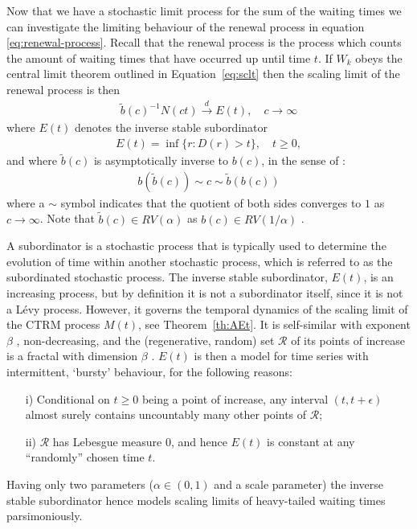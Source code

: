\documentclass[honours,12pt]{unswthesis}
\newcommand{\1}{\mathbf 1}
\newcommand{\cd}{\overset{d}{\longrightarrow}}
\numberwithin{equation}{section}
\theoremstyle{definition}
\theoremstyle{remark}
\begin{document}
Now that we have a stochastic limit process for the sum of the waiting times we can investigate the limiting behaviour of the renewal process in equation \ref{eq:renewal-process}. Recall that the renewal process is the process which counts the amount of waiting times that have occurred up until time $t$. If $W_k$ obeys the central limit theorem outlined in Equation~\ref{eq:sclt} then the scaling limit of the renewal process is then \cite{limitCTRW}
\begin{align}
\tilde b(c)^{-1}N(ct) \cd E(t), \quad c \to \infty
\end{align}
where $E(t)$ denotes the inverse stable subordinator \cite{invSubord}
\begin{align}\label{eq:invStable}
E(t) = \inf\{r: D(r) > t\}, \quad t \ge 0,
\end{align}
and where $\tilde b(c)$ is asymptotically inverse to $b(c)$, in the sense
of \cite[p.20]{seneta}: 
\begin{align}\label{eq:tildeb}
b(\tilde b(c)) \sim c \sim \tilde b(b(c))
\end{align}
where a $\sim$ symbol indicates that the quotient of both sides converges to
$1$ as $c \to \infty$. 
Note that $\tilde b(c) \in RV(\alpha)$ as $b(c) \in RV(1/\alpha)$ \cite[Prop~4.15]{MeerschaertSikorskii2012}. 

A subordinator is a stochastic process that is typically used to determine the evolution of time within another stochastic process, which is referred to as the subordinated stochastic process. 
The inverse stable subordinator, $E(t)$, is an increasing process, but by definition
it is not a subordinator itself, since it is not a L\'evy process. 
However, it governs the temporal dynamics of
the scaling limit of the CTRM process $M(t)$, see Theorem~\ref{th:AEt}. 
It is self-similar with exponent $\beta$
\cite{limitCTRW}, non-decreasing, and the (regenerative, random) set 
$\mathcal R$ of its points of increase is a fractal with dimension $\beta$ 
\cite{Bertoin04}.
$E(t)$ is then a model for time series with intermittent, `bursty'
behaviour, for the following reasons:
\begin{itemize}
\item [i)]
Conditional on $t \ge 0$ being a point of increase, any interval 
$(t, t+ \epsilon)$ almost surely contains uncountably many other points of 
$\mathcal R$; 
\item [ii)]
$\mathcal R$ has Lebesgue measure $0$, and hence $E(t)$ is
constant at any ``randomly'' chosen time $t$. 
\end{itemize}
Having only two parameters ($\alpha \in (0,1)$ and a scale parameter)
the inverse stable subordinator hence models scaling limits of heavy-tailed 
waiting times parsimoniously.
\end{document}
